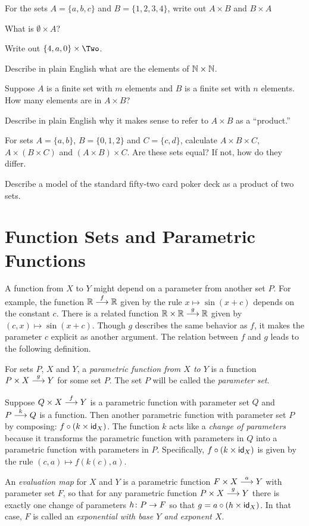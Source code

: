 \begin{exercises}
	\begin{nextexercise}
		\item For the sets $A = \{a,b,c\}$ and $B = \{1,2,3,4\}$, write out $A\times B$ and $B\times A$
		\item What is $\emptyset \times A$? 
		\item Write out $\{4,a,0\}\times \Two$.
		\item Describe in plain English what are the elements of $\NN\times \NN$.
		\item Suppose $A$ is a finite set with $m$ elements and $B$ is a finite set with $n$ elements.
		How many elements are in $A\times B$?
		\item Describe in plain English why it makes sense to refer to $A\times B$ as a ``product.''
		\item For sets $A=\{a,b\}$, $B=\{0,1,2\}$ and $C=\{c,d\}$, calculate $A\times B\times C$, $A\times (B\times C)$ and $(A\times B)\times C$. Are these sets equal? If not, how do they differ.
		\item Describe a model of the standard fifty-two card poker deck as a product of two sets.
	\end{nextexercise}
\end{exercises}

\section{Function Sets and Parametric Functions}

A function from $X$ to $Y$ might depend on a parameter from another set $P$. 
For example, the function $\sfromto f\RR\RR$ given by the rule $x \mapsto \sin(x + c)$ depends on the constant $c$.
There is a related function $\sfromto g{\RR\times \RR}\RR$ given by $(c,x) \mapsto \sin(x+c)$.
Though $g$ describes the same behavior as $f$, it makes the parameter $c$ explicit as another argument. The relation between $f$ and $g$ leads to the following definition.

\begin{defn}
	For sets $P$, $X$ and $Y$, a \emph{parametric function from $X$ to $Y$} is a function $\sfromto g{P\times X}Y$ for some set $P$.
	The set $P$ will be called the \emph{parameter set}.
	
	Suppose $\sfromto f{Q\times X}Y$ is a parametric function with parameter set $Q$ and $\sfromto kPQ$ is a function.
	Then another parametric function with parameter set $P$ by composing: $f\circ (k\times \id_X)$.
	The function $k$ acts like a \emph{change of parameters} because it transforms the parametric function with parameters in $Q$ into a parametric function with parameters in $P$. 
	Specifically, $f\circ(k\times \id_X)$ is given by the rule $(c,a)\mapsto f(k(c),a)$.
	
	An \emph{evaluation map} for $X$ and $Y$ is a parametric function $\sfromto a{F\times X}Y$ with parameter set $F$, so that for any 
	parametric function $\sfromto g{P\times X}Y$ there is exactly one change of parameters $\fromto hPF$ so that
	$g = a\circ (h\times \id_X)$. In that case, $F$ is called an \emph{exponential with base $Y$ and exponent $X$}.
\end{defn}

